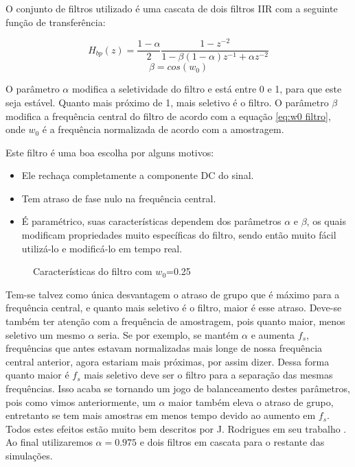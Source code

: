 \indent O conjunto de filtros utilizado é uma cascata de dois filtros IIR com a seguinte função de transferência:

\begin{equation}
H_{bp}(z)=\frac{1-\alpha}{2}\frac{1-z^{-2}}{1-\beta (1-\alpha) z^{-1} + \alpha z^{-2}}
\label{eq:filtro}
\end{equation}
\begin{equation}
\beta=cos(w_0)
\label{eq:w0 filtro}
\end{equation}

\indent O parâmetro $\alpha$ modifica a seletividade do filtro e está entre 0 e 1, para que este seja estável. Quanto mais próximo de 1, mais seletivo é o filtro. O parâmetro $\beta$ modifica a frequência central do filtro de acordo com a equação \ref{eq:w0 filtro}, onde $w_0$ é a frequência normalizada de acordo com a amostragem.

\indent Este filtro é uma boa escolha por alguns motivos:
\begin{itemize}
	\item Ele rechaça completamente a componente DC do sinal.
	\item Tem atraso de fase nulo na frequência central.
	\item É paramétrico, suas características dependem dos parâmetros $\alpha$ e $\beta$, os quais modificam propriedades muito específicas do filtro, sendo então muito fácil utilizá-lo e modificá-lo em tempo real.
\end{itemize}

\begin{figure}[h]
	\centering    
	\def\svgwidth{\columnwidth}
	
	\caption{Características do filtro com $w_0$=0.25}
	\label{fig:your image label}
\end{figure}

\indent Tem-se talvez como única desvantagem o atraso de grupo que é máximo para a frequência central, e quanto mais seletivo é o filtro, maior é esse atraso. Deve-se também ter atenção com a frequência de amostragem, pois quanto maior, menos seletivo um mesmo $\alpha$ seria. Se por exemplo, se mantém $\alpha$ e aumenta $f_s$, frequências que antes estavam normalizadas mais longe de nossa frequência central anterior, agora estariam mais próximas, por assim dizer. Dessa forma quanto maior é $f_s$ mais seletivo deve ser o filtro para a separação das mesmas frequências. Isso acaba se tornando um jogo de balanceamento destes parâmetros, pois como vimos anteriormente, um $\alpha$ maior também eleva o atraso de grupo, entretanto se tem mais amostras em menos tempo devido ao aumento em $f_s$. Todos estes efeitos estão muito bem descritos por J. Rodrigues em seu trabalho \cite{carvalho2008estimaccao}. Ao final utilizaremos $\alpha = 0.975$ e dois filtros em cascata para o restante das simulações.

